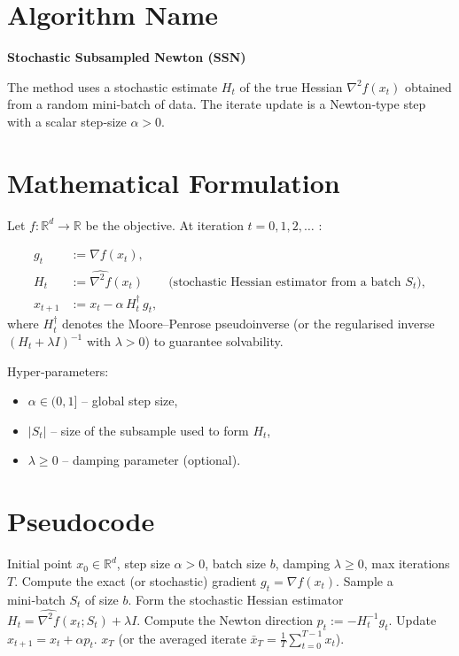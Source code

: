 \documentclass{article}
\newcommand{\R}{\mathbb{R}}
\newcommand{\grad}{\nabla}
\begin{document}
\section*{Algorithm Name}
\textbf{Stochastic Subsampled Newton (SSN)}  

The method uses a stochastic estimate $H_t$ of the true Hessian $\nabla^2 f(x_t)$ obtained from a random mini‑batch of data.  The iterate update is a Newton‑type step with a scalar step‑size $\alpha>0$.

\section*{Mathematical Formulation}
Let $f:\R^d\rightarrow\R$ be the objective.  
At iteration $t=0,1,2,\dots$ :

\begin{align}
g_t &:= \grad f(x_t) , \tag{1}\\
H_t &:= \widehat{\nabla^2 f}(x_t) \qquad\text{(stochastic Hessian estimator from a batch $S_t$)}, \tag{2}\\
x_{t+1} &:= x_t - \alpha \, H_t^{\dagger}\, g_t , \tag{3}
\end{align}
where $H_t^{\dagger}$ denotes the Moore–Penrose pseudoinverse (or the regularised inverse
$ (H_t+\lambda I)^{-1}$ with $\lambda>0$) to guarantee solvability.

Hyper‑parameters:
\begin{itemize}
\item $\alpha\in (0,1]$ – global step size,
\item $|S_t|$ – size of the subsample used to form $H_t$,
\item $\lambda\ge 0$ – damping parameter (optional).
\end{itemize}

\section*{Pseudocode}
\begin{algorithm}[H]
\caption{Stochastic Subsampled Newton (SSN)}
\begin{algorithmic}[1]
\Require Initial point $x_0\in\R^d$, step size $\alpha>0$, batch size $b$, damping $\lambda\ge0$, max iterations $T$.
    \State Compute the exact (or stochastic) gradient $g_t=\grad f(x_t)$.
    \State Sample a mini‑batch $S_t$ of size $b$.
    \State Form the stochastic Hessian estimator 
    $H_t=\widehat{\nabla^2 f}(x_t;S_t)+\lambda I$.
    \State Compute the Newton direction $p_t:= - H_t^{-1} g_t$.
    \State Update $x_{t+1}=x_t+\alpha p_t$.
\EndFor
\State \Return $x_T$ (or the averaged iterate $\bar x_T=\frac1T\sum_{t=0}^{T-1}x_t$).
\end{algorithmic}
\end{algorithm}
\end{document}
